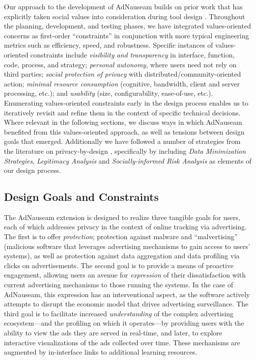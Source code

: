 \documentclass[conference]{IEEEtran}
\begin{document}
Our approach to the development of AdNauseam builds on prior work that has explicitly taken social values into consideration during tool design \cite{Friedman,Flanagan,Howe-1}. Throughout the planning, development, and testing phases, we have integrated values-oriented concerns as first-order “constraints” in conjunction with more typical engineering metrics such as efficiency, speed, and robustness. Specific instances of values-oriented constraints include \emph{visibility and transparency} in interface, function, code, process, and strategy; \emph{personal autonomy}, where users need not rely on third parties; \emph{social protection of privacy} with distributed/community-oriented action; \emph{minimal resource consumption} (cognitive, bandwidth, client and server processing, etc.); and \emph{usability} (size, configurability, ease-of-use, etc.). Enumerating values-oriented constraints early in the design process enables us to iteratively revisit and refine them in the context of specific technical decisions. Where relevant in the following sections, we discuss ways in which AdNauseam benefited from this values-oriented approach, as well as tensions between design goals that emerged. Additionally we have followed a number of strategies from the literature on privacy-by-design \cite{Gurses-0, Hoepman, Gurses-1, Hansen, Cavoukian}, specifically by including \emph{Data Minimization Strategies}, \emph{Legitimacy Analysis} and \emph{Socially-informed Risk Analysis} as elements of our design process.

\subsection{Design Goals and Constraints}

The AdNauseam extension is designed to realize three tangible goals for users, each of which addresses privacy in the context of online tracking via advertising. The first is to offer \emph{protection}; protection against malware and “malvertising” (malicious software that leverages advertising mechanisms to gain access to users' systems\cite{Mansfield}), as well as protection against data aggregation and data profiling via clicks on advertisements. The second goal is to provide a means of proactive engagement, allowing users an avenue for \emph{expression} of their dissatisfaction with current advertising mechanisms to those running the systems. In the case of AdNauseam, this expression has an interventional aspect, as the software actively attempts to disrupt the economic model that drives advertising surveillance. The third goal is to facilitate increased \emph{understanding} of the complex advertising ecosystem---and the profiling on which it operates---by providing users with the ability to view the ads they are served in real-time, and later, to explore interactive visualizations of the ads collected over time. These mechanisms are augmented by in-interface links to additional learning resources.
\end{document}
